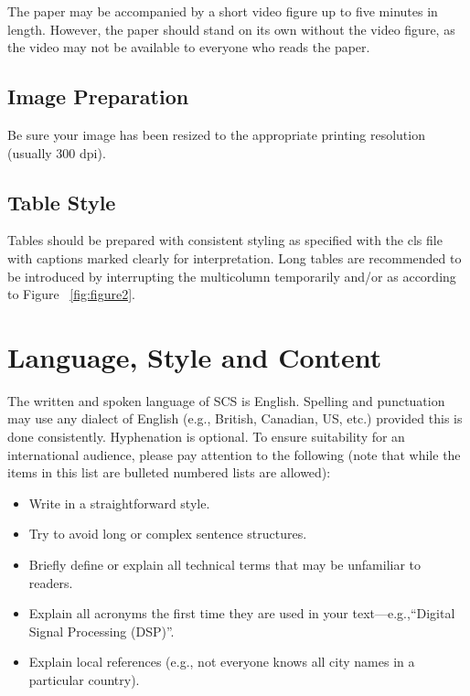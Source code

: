 \documentclass{scsSimAUDPaperFormat}
\begin{document}
The paper may be accompanied by a short video figure up to five minutes in length. However, the paper should stand on its own without the video figure, as the video may not be available to everyone who reads the paper.


\subsection{Image Preparation}

Be sure your image has been resized to the appropriate printing resolution (usually 300 dpi).

\subsection{Table Style}
Tables should be prepared with consistent styling as specified with the cls file with captions marked clearly for interpretation. Long tables are recommended to be introduced by interrupting the multicolumn temporarily and/or as according to Figure ~\ref{fig:figure2}.
\section{Language, Style and Content}

The written and spoken language of SCS is English. Spelling and punctuation may use any dialect of English (e.g., British, Canadian, US, etc.) provided this is done consistently. Hyphenation is optional. To ensure suitability for an international audience, please pay attention to the following (note that while the items in this list are bulleted numbered lists are allowed):

\begin{itemize}
\item Write in a straightforward style.
\item Try to avoid long or complex sentence structures.
\item Briefly define or explain all technical terms that may be unfamiliar to readers.
\item Explain all acronyms the first time they are used in your text---e.g.,``Digital Signal Processing (DSP)''.
\item Explain local references (e.g., not everyone knows all city names in a particular country).
\end{itemize}
\end{document}
